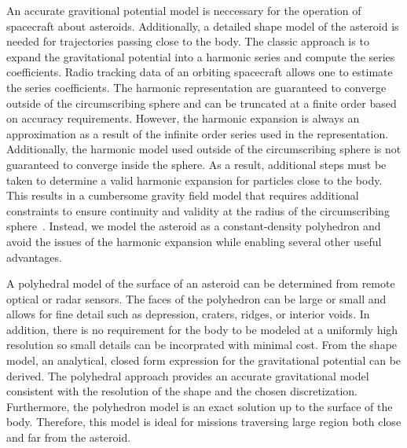 \documentclass[]{aiaa-tc}%
\begin{document}
An accurate gravitional potential model is neccessary for the operation of spacecraft about asteroids.
Additionally, a detailed shape model of the asteroid is needed for trajectories passing close to the body.
The classic approach is to expand the gravitational potential into a harmonic series and compute the series coefficients.
Radio tracking data of an orbiting spacecraft allows one to estimate the series coefficients.
The harmonic representation are guaranteed to converge outside of the circumscribing sphere and can be truncated at a finite order based on accuracy requirements.
However, the harmonic expansion is always an approximation as a result of the infinite order series used in the representation.
Additionally, the harmonic model used outside of the circumscribing sphere is not guaranteed to converge inside the sphere.
As a result, additional steps must be taken to determine a valid harmonic expansion for particles close to the body.
This results in a cumbersome gravity field model that requires additional constraints to ensure continuity and validity at the radius of the circumscribing sphere~\cite{werner1996}.
Instead, we model the asteroid as a constant-density polyhedron and avoid the issues of the harmonic expansion while enabling several other useful advantages.

A polyhedral model of the surface of an asteroid can be determined from remote optical or radar sensors.
The faces of the polyhedron can be large or small and allows for fine detail such as depression, craters, ridges, or interior voids.
In addition, there is no requirement for the body to be modeled at a uniformly high resolution so small details can be incorprated with minimal cost.
From the shape model, an analytical, closed form expression for the gravitational potential can be derived.
The polyhedral approach provides an accurate gravitational model consistent with the resolution of the shape and the chosen discretization.
Furthermore, the polyhedron model is an exact solution up to the surface of the body.
Therefore, this model is ideal for missions traversing large region both close and far from the asteroid.
\end{document}
